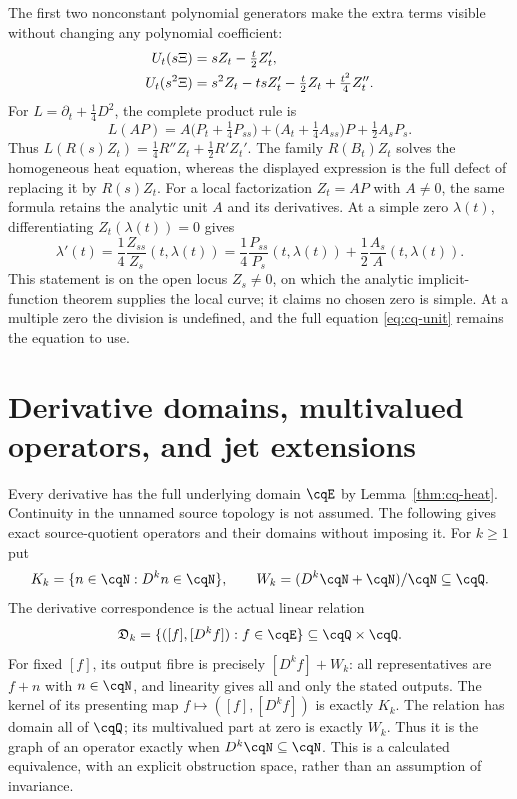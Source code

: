 The first two nonconstant polynomial generators make the extra terms
visible without changing any polynomial coefficient:
\begin{align}\label{eq:cq-generators}
 U_t(s\Xi)&=sZ_t-\tfrac t2Z_t',\notag\\
 U_t(s^2\Xi)&=s^2Z_t-t sZ_t'-\tfrac t2Z_t+\tfrac{t^2}4Z_t''.
\end{align}
For $L=\partial_t+\tfrac14D^2$, the complete product rule is
\begin{equation}\label{eq:cq-unit}
 L(AP)=A\bigl(P_t+\tfrac14P_{ss}\bigr)
       +\bigl(A_t+\tfrac14A_{ss}\bigr)P
       +\tfrac12A_sP_s.
\end{equation}
Thus $L(R(s)Z_t)=\tfrac14R''Z_t+\tfrac12R'Z_t'$.
The family $R(B_t)Z_t$ solves the homogeneous heat equation, whereas
the displayed expression is the full defect of replacing it by
$R(s)Z_t$. For a local factorization $Z_t=AP$ with $A\ne0$,
the same formula retains the analytic unit $A$ and its derivatives.
At a simple zero $\lambda(t)$, differentiating
$Z_t(\lambda(t))=0$ gives
\begin{equation}\label{eq:cq-zero}
 \lambda'(t)=\frac14\frac{Z_{ss}}{Z_s}(t,\lambda(t))
 =\frac14\frac{P_{ss}}{P_s}(t,\lambda(t))
    +\frac12\frac{A_s}{A}(t,\lambda(t)).
\end{equation}
This statement is on the open locus $Z_s\ne0$, on which the analytic
implicit-function theorem supplies the local curve; it claims no
chosen zero is simple. At a multiple zero the division is undefined,
and the full equation \eqref{eq:cq-unit} remains the equation to use.

\section{Derivative domains, multivalued operators, and jet extensions}
\label{sec:cq-jets}
Every derivative has the full underlying domain $\cqE$ by
Lemma~\ref{thm:cq-heat}. Continuity in the unnamed source topology is
not assumed. The following gives exact source-quotient operators and
their domains without imposing it. For $k\geq1$ put
\[
 K_k=\{n\in\cqN:D^kn\in\cqN\},\qquad
 W_k=(D^k\cqN+\cqN)/\cqN\subseteq\cqQ.
\]
The derivative correspondence is the actual linear relation
\begin{equation}\label{eq:cq-relation}
 \mathfrak D_k=\{([f],[D^kf]):f\in\cqE\}
                    \subseteq\cqQ\times\cqQ.
\end{equation}
For fixed $[f]$, its output fibre is precisely $[D^kf]+W_k$:
all representatives are $f+n$ with $n\in\cqN$, and linearity gives
all and only the stated outputs. The kernel of its presenting map
$f\mapsto([f],[D^kf])$ is exactly $K_k$. The relation has domain
all of $\cqQ$; its multivalued part at zero is exactly $W_k$.
Thus it is the graph of an operator exactly when $D^k\cqN\subseteq
\cqN$. This is a calculated equivalence, with an explicit obstruction
space, rather than an assumption of invariance.


